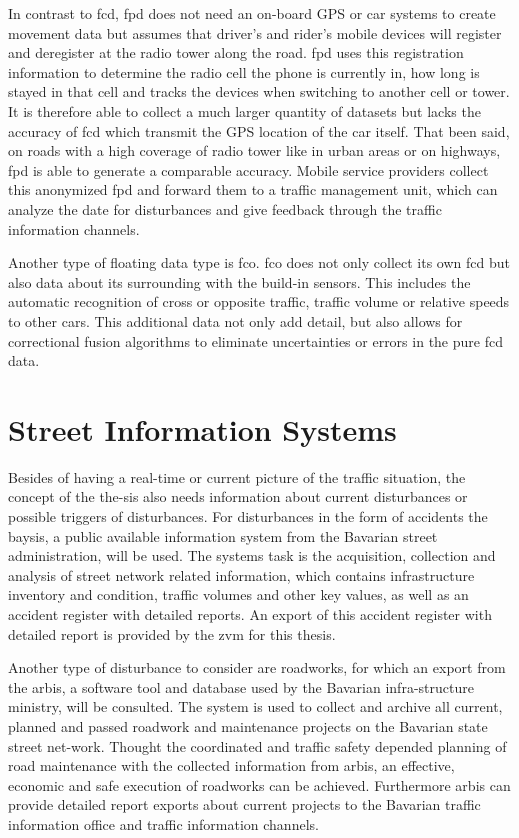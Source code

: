 \documentclass[a4paper,12pt]{report}
\begin{document}
In contrast to \acrshort{fcd}, \acrlong{fpd} does not need an on-board GPS or car systems to create movement data but assumes that driver’s and rider’s mobile devices will register and deregister at the radio tower along the road. \acrshort{fpd} uses this registration information to determine the radio cell the phone is currently in, how long is stayed in that cell and tracks the devices when switching to another cell or tower. It is therefore able to collect a much larger quantity of datasets but lacks the accuracy of \acrshort{fcd} which transmit the GPS location of the car itself. That been said, on roads with a high coverage of radio tower like in urban areas or on highways, \acrshort{fpd} is able to generate a comparable accuracy. Mobile service providers collect this anonymized \acrshort{fpd} and forward them to a traffic management unit, which can analyze the date for disturbances and give feedback through the traffic information channels. \cite{Randelhoff2016,LAPID2020}

Another type of floating data type is \acrfull{fco}. \acrshort{fco} does not only collect its own \acrshort{fcd} but also data about its surrounding with the build-in sensors. This includes the automatic recognition of cross or opposite traffic, traffic volume or relative speeds to other cars. This additional data not only add detail, but also allows for correctional fusion algorithms to eliminate uncertainties or errors in the pure \acrshort{fcd} data. \cite{Randelhoff2016}

\section{Street Information Systems}

Besides of having a real-time or current picture of the traffic situation, the concept of the the-sis also needs information about current disturbances or possible triggers of disturbances. For disturbances in the form of accidents the \acrfull{baysis}, a public available information system from the Bavarian street administration, will be used. The systems task is the acquisition, collection and analysis of street network related information, which contains infrastructure inventory and condition, traffic volumes and other key values, as well as an accident register with detailed reports. An export of this accident register with detailed report is provided by the \acrshort{zvm} for this thesis.

Another type of disturbance to consider are roadworks, for which an export from the \acrfull{arbis}, a software tool and database used by the Bavarian infra-structure ministry, will be consulted. The system is used to collect and archive all current, planned and passed roadwork and maintenance projects on the Bavarian state street net-work. Thought the coordinated and traffic safety depended planning of road maintenance with the collected information from \acrshort{arbis}, an effective, economic and safe execution of roadworks can be achieved. Furthermore \acrshort{arbis} can provide detailed report exports about current projects to the Bavarian traffic information office and traffic information channels. \cite{trafficon2017}
\end{document}
